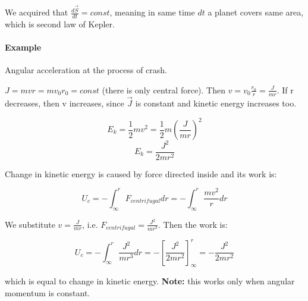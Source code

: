 We acquired that $\frac{d\vec{S}}{dt} = const$, meaning in same time $dt$ a planet covers same area, which is second law of Kepler.
\paragraph{Example} Angular acceleration at the process of crash.

$J = mvr =  mv_0r_0 =const$ (there is only central force). Then $v = v_0 \frac{r_0}{r}= \frac{J}{mr}$. If r decreases, then v increases, since $\vec{J}$ is constant and kinetic energy increases too.

$$E_k = \frac{1}{2}mv^2 = \frac{1}{2}m \left( \frac{J}{mr} \right)^2$$
$$E_k = \frac{J^2}{2mr^2}$$

Change in kinetic energy is caused by force directed inside and its work is:

$$U_c = - \int_{\infty}^{r} F_{centrifugal} dr = - \int_{\infty}^{r} \frac{mv^2}{r} dr $$

We substitute $v  =\frac{J}{mr}$, i.e. $F_{centrifugal} = \frac{J^2}{mr^3}$. Then the work is:

$$U_c = - \int_{\infty}^{r} \frac{J^2}{mr^3} dr = -\left[ \frac{J^2}{2mr^2} \right]_{\infty}^{r} =- \frac{J^2}{2mr^2}$$

which is equal to change in kinetic energy. \textbf{Note:} this works only when angular momentum is constant.

